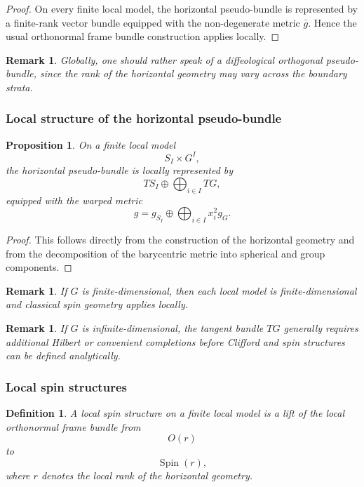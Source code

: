 \documentclass[11pt]{amsart}
\newtheorem{proposition}[theorem]{Proposition}
\newtheorem{definition}[theorem]{Definition}
\newtheorem{remark}[theorem]{Remark}
\begin{document}
\begin{proof}
On every finite local model, the horizontal pseudo-bundle is represented by a
finite-rank vector bundle equipped with the non-degenerate metric \(\bar g\).
Hence the usual orthonormal frame bundle construction applies locally.
\end{proof}

\begin{remark}
Globally, one should rather speak of a diffeological orthogonal
pseudo-bundle, since the rank of the horizontal geometry may vary across the
boundary strata.
\end{remark}

\subsubsection{Local structure of the horizontal pseudo-bundle}

\begin{proposition}
On a finite local model
\[
S_I\times G^I,
\]
the horizontal pseudo-bundle is locally represented by
\[
TS_I
\oplus
\bigoplus_{i\in I} TG,
\]
equipped with the warped metric
\[
g
=
g_{S_I}
\oplus
\bigoplus_{i\in I} x_i^2 g_G.
\]
\end{proposition}

\begin{proof}
This follows directly from the construction of the horizontal geometry and
from the decomposition of the barycentric metric into spherical and group
components.
\end{proof}

\begin{remark}
If \(G\) is finite-dimensional, then each local model is finite-dimensional
and classical spin geometry applies locally.
\end{remark}

\begin{remark}
If \(G\) is infinite-dimensional, the tangent bundle \(TG\) generally requires
additional Hilbert or convenient completions before Clifford and spin
structures can be defined analytically.
\end{remark}

\subsubsection{Local spin structures}

\begin{definition}
A local spin structure on a finite local model is a lift of the local
orthonormal frame bundle from
\[
O(r)
\]
to
\[
\operatorname{Spin}(r),
\]
where \(r\) denotes the local rank of the horizontal geometry.
\end{definition}
\end{document}

